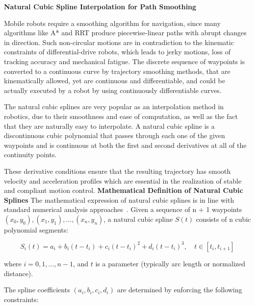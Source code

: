 \textbf{Natural Cubic Spline Interpolation for Path Smoothing}

Mobile robots require a smoothing algorithm for navigation, since many algorithms like A* and RRT produce piecewise-linear paths with abrupt changes in direction. Such non-circular motions are in contradiction to the kinematic constraints of differential-drive robots, which leads to jerky motions, loss of tracking accuracy and mechanical fatigue. The discrete sequence of waypoints is converted to a continuous curve by trajectory smoothing methods, that are kinematically allowed, yet are continuous and differentiable, and could be actually executed by a robot by using continuously differentiable curves.

The natural cubic splines are very popular as an interpolation method in robotics, due to their smoothness and ease of computation, as well as the fact that they are naturally easy to interpolate. A natural cubic spline is a discontinuous cubic polynomial that passes through each one of the given waypoints and is continuous at both the first and second derivatives at all of the continuity points.

These derivative conditions ensure that the resulting trajectory has smooth velocity and acceleration profiles which are essential in the realization of stable and compliant motion control.
\textbf{Mathematical Definition of Natural Cubic Splines}
The mathematical expression of natural cubic splines is in line with standard numerical 
analysis approaches~\cite{siciliano2016springer}.
Given a sequence of n + 1 waypoints $(x_0, y_0), (x_1, y_1), \ldots, (x_n, y_n)$, a natural cubic spline $S(t)$ consists of n cubic polynomial segments:

\begin{equation}
S_i(t) = a_i + b_i(t - t_i) + c_i(t - t_i)^2 + d_i(t - t_i)^3, \quad t \in [t_i, t_{i+1}]
\end{equation}

where $i = 0, 1, \ldots, n - 1$, and $t$ is a parameter (typically arc length or normalized distance).

The spline coefficients $(a_i, b_i, c_i, d_i)$ are determined by enforcing the following constraints:

